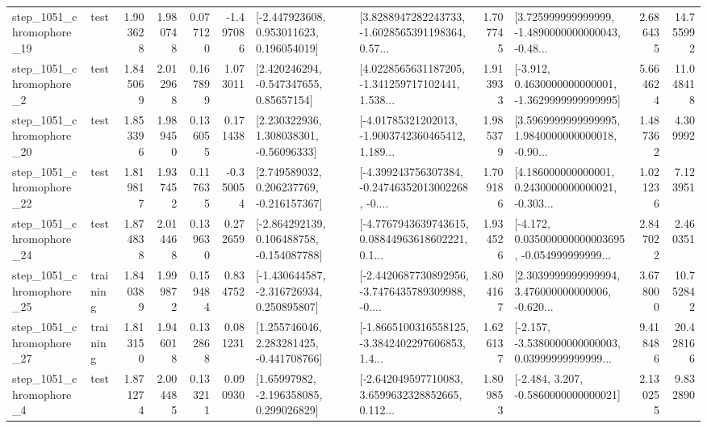 \begin{tabular}{llrrrrllrlrr}
 step\_1051\_chromophore\_19 &      test &      1.903628 &    1.980748 &      0.077120 & -1.497086 &    [-2.447923608, 0.953011623, 0.196054019] &  [3.8288947282243733, -1.6028565391198364, 0.57... &       1.707745 &  [3.725999999999999, -1.4890000000000043, -0.48... &            2.686435 &         14.755992 \\
  step\_1051\_chromophore\_2 &      test &      1.845069 &    2.012968 &      0.167899 &  1.073011 &     [2.420246294, -0.547347655, 0.85657154] &  [4.0228565631187205, -1.341259717102441, 1.538... &       1.913933 &  [-3.912, 0.4630000000000001, -1.3629999999999995] &            5.664624 &         11.048418 \\
 step\_1051\_chromophore\_20 &      test &      1.853396 &    1.989450 &      0.136055 &  0.171438 &     [2.230322936, 1.308038301, -0.56096333] &  [-4.01785321202013, -1.9003742360465412, 1.189... &       1.985379 &  [3.5969999999999995, 1.9840000000000018, -0.90... &            1.487362 &          4.309992 \\
 step\_1051\_chromophore\_22 &      test &      1.819817 &    1.937452 &      0.117635 & -0.350054 &    [2.749589032, 0.206237769, -0.216157367] &  [-4.399243756307384, -0.24746352013002268, -0.... &       1.709186 &  [4.186000000000001, 0.2430000000000021, -0.303... &            1.021236 &          7.123951 \\
 step\_1051\_chromophore\_24 &      test &      1.874838 &    2.014468 &      0.139630 &  0.272659 &   [-2.864292139, 0.106488758, -0.154087788] &  [-4.7767943639743615, 0.08844963618602221, 0.1... &       1.934526 &  [-4.172, 0.035000000000003695, -0.054999999999... &            2.847022 &          2.460351 \\
 step\_1051\_chromophore\_25 &  training &      1.840389 &    1.999872 &      0.159484 &  0.834752 &   [-1.430644587, -2.316726934, 0.250895807] &  [-2.4420687730892956, -3.7476435789309988, -0.... &       1.804167 &  [2.3039999999999994, 3.476000000000006, -0.620... &            3.678000 &         10.752842 \\
 step\_1051\_chromophore\_27 &  training &      1.813150 &    1.946018 &      0.132868 &  0.081231 &    [1.255746046, 2.283281425, -0.441708766] &  [-1.8665100316558125, -3.3842402297606853, 1.4... &       1.626137 &  [-2.157, -3.5380000000000003, 0.03999999999999... &            9.418486 &         20.428166 \\
  step\_1051\_chromophore\_4 &      test &      1.871274 &    2.004485 &      0.133211 &  0.090930 &     [1.65997982, -2.196358085, 0.299026829] &  [-2.642049597710083, 3.6599632328852665, 0.112... &       1.809853 &               [-2.484, 3.207, -0.5860000000000021] &            2.130255 &          9.832890 \\

\end{tabular}
